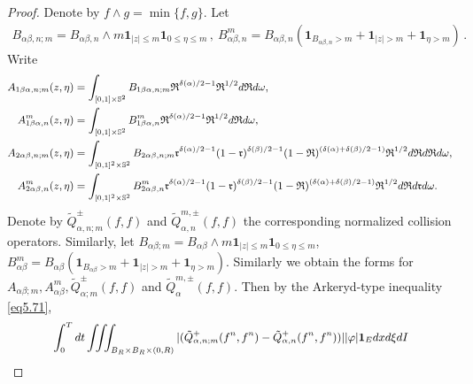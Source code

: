 \documentclass[reqno,11pt]{amsart}
\numberwithin{equation}{section}
\begin{document}
\begin{proof}
Denote by $f \wedge g = \min \{ f, g \}$. Let 
\begin{equation*}
  \begin{aligned}
    B_{\alpha \beta ,n ;m}=B_{\alpha \beta ,n}\wedge m \mathbf{1}_{|z|\leq m} \mathbf{1}_{0\leq \eta \leq m} \,, \ B^m_{\alpha \beta ,n}=B_{\alpha \beta ,n}(\mathbf{1}_{B_{\alpha \beta ,n}>m}+\mathbf{1}_{|z|>m}+\mathbf{1}_{\eta >m}) \,.
  \end{aligned}
\end{equation*}
Write 
	\begin{equation*}{\small
		\begin{aligned}
		A_{1\beta \alpha  ,n ;m} (z,\eta )&= \int_{[0,1] \times \mathbb{S}^2 } B_{1\beta \alpha  ,n ;m} \mathfrak{R}^{\delta(\alpha)/2-1} \mathfrak{R}^{1/2} d \mathfrak{R} d \omega, \\
		A^m_{1\beta \alpha  ,n } (z,\eta )& = \int_{[0,1] \times \mathbb{S}^2 } B^m_{1\beta \alpha  ,n} \mathfrak{R}^{\delta(\alpha)/2-1} \mathfrak{R}^{1/2} d \mathfrak{R} d \omega, \\
		A_{2\alpha \beta ,n ;m}(z,\eta )&= \int_{[0,1]^2 \times \mathbb{S}^2 } B_{2\alpha \beta ,n ;m} \mathfrak{r}^{\delta(\alpha)/2-1}(1-\mathfrak{r})^{\delta(\beta )/2-1} (1-\mathfrak{R})^{(\delta(\alpha)+\delta(\beta )/2-1)} \mathfrak{R}^{1/2} d \mathfrak{R} d \mathfrak{R} d \omega, \\
		 A^m_{2\alpha \beta ,n }(z,\eta )&= \int_{[0,1]^2 \times \mathbb{S}^2 } B^m_{2\alpha \beta ,n } \mathfrak{r}^{\delta(\alpha)/2-1}(1- \mathfrak{r})^{\delta(\beta )/2-1}(1-\mathfrak{R})^{(\delta(\alpha)+\delta(\beta )/2-1)}\mathfrak{R}^{1/2}d \mathfrak{R} d \mathfrak{r} d\omega.
		\end{aligned}}
	\end{equation*}
Denote by $\tilde{Q}^\pm _{\alpha ,n ;m}(f,f)$ and $\tilde{Q}^{m, \pm} _{\alpha ,n }(f,f)$ the corresponding normalized collision operators. Similarly, let $B_{\alpha \beta ; m}=B_{\alpha \beta }\wedge m \mathbf{1}_{|z|\leq m} \mathbf{1}_{0\leq \eta \leq m}$, $B^m_{\alpha \beta }=B_{\alpha \beta }( \mathbf{1}_{B_{\alpha \beta }>m}+ \mathbf{1}_{|z|>m}+ \mathbf{1}_{\eta >m})$. Similarly we obtain the forms for $A_{\alpha \beta ;m}, A^m_{\alpha \beta}, \tilde{Q}^\pm _{\alpha ;m}(f,f)$ and $\tilde{Q}^{m, \pm} _{\alpha}(f,f)$. Then by the Arkeryd-type inequality \eqref{eq5.71},
	\begin{equation*}{\small
		\begin{aligned}
			&\int_{0}^{T}dt \iiint_{B_R \times B_R \times(0,R)} |(\tilde{Q}^{+}_{\alpha ,n;m}(f^n,f^n) -\tilde{Q}^+_{\alpha,n} (f^n,f^n) )| | \varphi | \mathbf{1}_E dxd\xi dI \\

\end{aligned}}
\end{equation*}
\end{proof}
\end{document}
